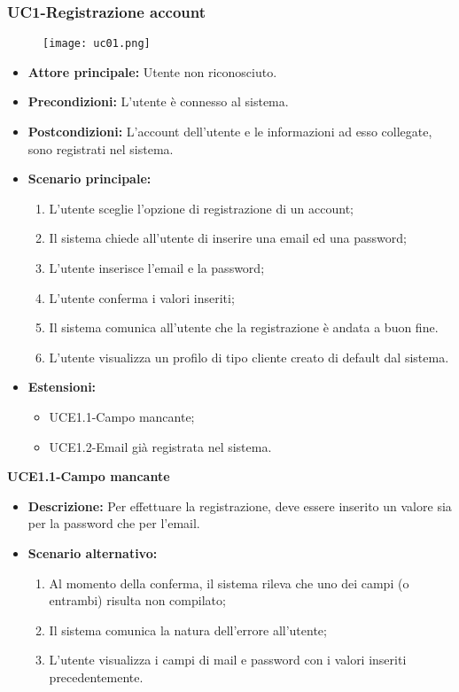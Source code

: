 \subsubsection{UC1-Registrazione account}
\begin{figure}[h] \texttt{[image: uc01.png]} \end{figure}
\begin{itemize}
    \item \textbf{Attore principale: }Utente non riconosciuto.
    \item \textbf{Precondizioni: }L'utente è connesso al sistema.
    \item \textbf{Postcondizioni: }L'account dell'utente e le informazioni ad esso collegate, sono registrati nel sistema.
    \item \textbf{Scenario principale:}
        \begin{enumerate}
            \item L'utente sceglie l'opzione di registrazione di un account;
            \item Il sistema chiede all'utente di inserire una email ed una password;
            \item L'utente inserisce l'email e la password;
            \item L'utente conferma i valori inseriti;
            \item Il sistema comunica all'utente che la registrazione è andata a buon fine.
            \item L'utente visualizza un profilo di tipo cliente creato di default dal sistema.
        \end{enumerate}
    \item \textbf{Estensioni:}
        \begin{itemize}
                \item UCE1.1-Campo mancante;
                \item UCE1.2-Email già registrata nel sistema.
        \end{itemize}
\end{itemize}

\textbf{UCE1.1-Campo mancante}
\begin{itemize}
    \item \textbf{Descrizione:} Per effettuare la registrazione, deve essere inserito un valore sia per la password che per l'email.
    \item \textbf{Scenario alternativo:}
    \begin{enumerate}
        \item Al momento della conferma, il sistema rileva che uno dei campi (o entrambi) risulta non compilato;
        \item Il sistema comunica la natura dell'errore all'utente;
        \item L'utente visualizza i campi di mail e password con i valori inseriti precedentemente.
    \end{enumerate}
\end{itemize}


